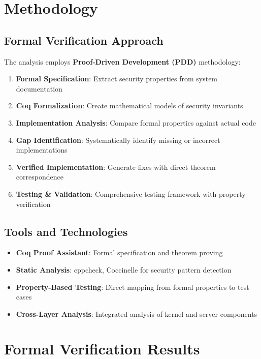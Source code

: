 \documentclass[11pt,a4paper]{article}
\begin{document}
\section{Methodology}

\subsection{Formal Verification Approach}

The analysis employs \textbf{Proof-Driven Development (PDD)} methodology:

\begin{enumerate}
    \item \textbf{Formal Specification}: Extract security properties from system documentation
    \item \textbf{Coq Formalization}: Create mathematical models of security invariants
    \item \textbf{Implementation Analysis}: Compare formal properties against actual code
    \item \textbf{Gap Identification}: Systematically identify missing or incorrect implementations
    \item \textbf{Verified Implementation}: Generate fixes with direct theorem correspondence
    \item \textbf{Testing \& Validation}: Comprehensive testing framework with property verification
\end{enumerate}

\subsection{Tools and Technologies}

\begin{itemize}
    \item \textbf{Coq Proof Assistant}: Formal specification and theorem proving
    \item \textbf{Static Analysis}: cppcheck, Coccinelle for security pattern detection
    \item \textbf{Property-Based Testing}: Direct mapping from formal properties to test cases
    \item \textbf{Cross-Layer Analysis}: Integrated analysis of kernel and server components
\end{itemize}

\section{Formal Verification Results}
\end{document}
